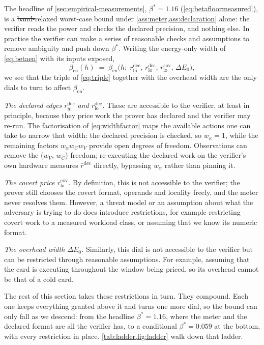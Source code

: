 \documentclass{article}
\makeatletter
\theoremstyle{plain}
\theoremstyle{definition}
\theoremstyle{remark}
\providecommand{\DIFdeltex}[1]{{\protect\color{red}\sout{#1}}} %
\providecommand{\DIFdelbegin}{} %
\providecommand{\DIFdelend}{} %
\providecommand{\DIFdel}[1]{\texorpdfstring{\DIFdeltex{#1}}{}} %
\providecommand{\DIFscaledelfig}{0.5}
\newlength{\DIFdelgraphicswidth} %
\newlength{\DIFdelgraphicsheight} %
\providecommand{\DIFdelincludegraphics}[2][]{%
\sbox{\DIFdelgraphicsbox}{\DIFOincludegraphics[#1]{#2}}%
\settoboxwidth{\DIFdelgraphicswidth}{\DIFdelgraphicsbox} %
\settoboxtotalheight{\DIFdelgraphicsheight}{\DIFdelgraphicsbox} %
\scalebox{\DIFscaledelfig}{%
\parbox[b]{\DIFdelgraphicswidth}{\usebox{\DIFdelgraphicsbox}\\[-\baselineskip] \rule{\DIFdelgraphicswidth}{0em}}\llap{\resizebox{\DIFdelgraphicswidth}{\DIFdelgraphicsheight}{%
\setlength{\unitlength}{\DIFdelgraphicswidth}%
\begin{picture}(1,1)%
\thicklines\linethickness{2pt} %
{\color[rgb]{1,0,0}\put(0,0){\framebox(1,1){}}}%
{\color[rgb]{1,0,0}\put(0,0){\line( 1,1){1}}}%
{\color[rgb]{1,0,0}\put(0,1){\line(1,-1){1}}}%
\end{picture}%
}\hspace*{3pt}}} %
} %
\DeclareRobustCommand{\DIFdelbegin}{\DIFOdelbegin \let\includegraphics\DIFdelincludegraphics} %
\DeclareRobustCommand{\DIFdelend}{\DIFOaddend \let\includegraphics\DIFOincludegraphics} %
\let\sout@orig\sout %
\renewcommand{\sout}[1]{\ifmmode\text{\sout@orig{\ensuremath{#1}}}\else\sout@orig{#1}\fi} %
\makeatother
\begin{document}
The headline of \cref{sec:empirical-measurements}, $\beta^{*} = 1.16$
(\cref{eq:betafloormeasured}), is a \DIFdelbegin \DIFdel{band-}\DIFdelend relaxed worst-case bound under
\cref{ass:meter,ass:declaration} alone: the verifier reads the power and
checks the declared precision, and nothing else. In practice the verifier can
make a series of reasonable checks and assumptions to remove ambiguity and push
down $\beta^{*}$. Writing the
energy-only width of \cref{eq:betaen} with its inputs exposed,
\begin{equation}
	\beta_{\mathrm{en}}(h) \;=\;
	\beta_{\mathrm{en}}\bigl(h;\;
	r_{\mathrm{hi}}^{\mathrm{dec}},\,
	r_{\mathrm{lo}}^{\mathrm{dec}},\,
	r_{\mathrm{lo}}^{\mathrm{cov}},\,
	\Delta E_0\bigr),
	\label{eq:betadials}
\end{equation}
we see that the triple of \cref{eq:triple} together with the overhead width are the only
dials to turn to affect $\beta_{\mathrm{en}}$.

\emph{The declared edges $r_{\mathrm{hi}}^{\mathrm{dec}}$ and
$r_{\mathrm{lo}}^{\mathrm{dec}}$.} These are accessible to the verifier, at
least in principle, because they price work the prover has declared and the
verifier may re-run. The factorisation of \cref{eq:widthfactor} maps the available actions one can take to narrow that width: the declared precision is checked,
so $w_\kappa = 1$, while the remaining factors $w_\alpha w_C w_V$ provide open degrees of
freedom. Observations can remove the ($w_V$, $w_C$) freedom;
re-executing the declared work on the verifier's own hardware measures
$\bar r^{\mathrm{dec}}$ directly, bypassing $w_\alpha$ rather than pinning it.

\emph{The covert price $r_{\mathrm{lo}}^{\mathrm{cov}}$.} By definition, this is not accessible to the verifier; the prover still chooses the covert format, operands and locality freely,
and the meter never resolves them. However, a threat model or an assumption about what the
adversary is trying to do does introduce restrictions, for example
restricting covert work to a measured workload class, or assuming that we know
its numeric format.

\emph{The overhead width $\Delta E_0$.} Similarly, this dial is not
accessible to the verifier but can be restricted through reasonable
assumptions. For example, assuming that the card is executing throughout the
window being priced, so its overhead cannot be that of a cold card.

The rest of this section takes these restrictions in turn. They compound. Each
one keeps everything granted above it and turns one more dial, so the bound can
only fall as we descend: from the headline $\beta^{*} = 1.16$, where the meter
and the declared format are all the verifier has, to a conditional
$\beta^{*} = 0.059$ at the bottom, with every restriction in place.
\cref{tab:ladder,fig:ladder} walk down that ladder.
\end{document}
